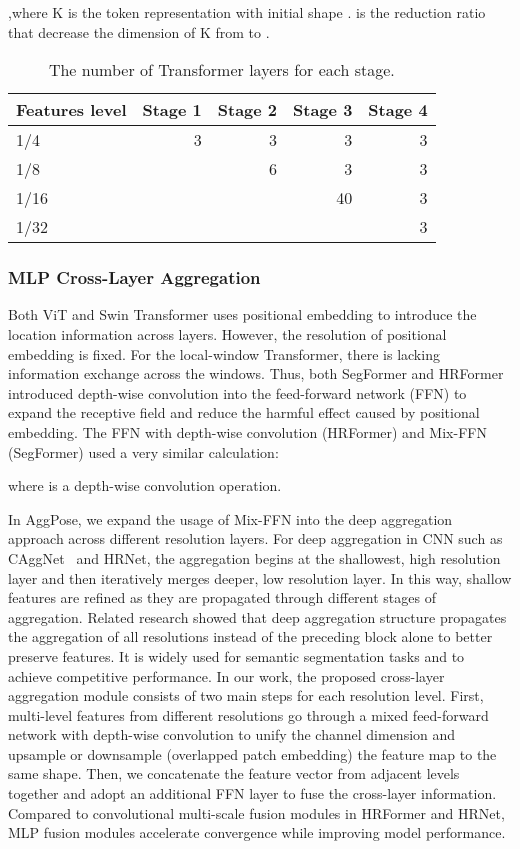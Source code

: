 \documentclass{article}
\begin{document}
,where K is the token representation with initial shape .  is the reduction ratio that decrease the dimension of K from  to .




\begin{table}
\centering
\begin{tabular}{lrrrr}
\toprule
Features level  & Stage 1 & Stage 2 & Stage 3 & Stage 4 \\
\midrule
1/4 & 3  & 3    & 3 & 3      \\
1/8 &   & 6 & 3 & 3       \\
1/16    &   &   & 40    & 3      \\
1/32    &   &   &   & 3      \\
\bottomrule
\end{tabular}
\caption{The number of Transformer layers for each stage.}
\label{tab:transformer_blocks}
\end{table}


\subsubsection{MLP Cross-Layer Aggregation}

Both ViT and Swin Transformer uses positional embedding to introduce the location information across layers. However, the resolution of positional embedding is fixed. For the local-window Transformer, there is lacking information exchange across the windows. Thus, both SegFormer and HRFormer introduced  depth-wise convolution into the feed-forward network (FFN) to expand the receptive field and reduce the harmful effect caused by positional embedding. The FFN with depth-wise convolution (HRFormer) and Mix-FFN (SegFormer) used a very similar calculation:



where  is a  depth-wise convolution operation.

In AggPose, we expand the usage of Mix-FFN into the deep aggregation approach across different resolution layers. For deep aggregation in CNN such as CAggNet~\cite{cao2021caggnet} and HRNet, the aggregation begins at the shallowest, high resolution layer and then iteratively merges deeper, low resolution layer. In this way, shallow features are refined as they are propagated through different stages of aggregation. Related research showed that deep aggregation structure propagates the aggregation of all resolutions instead of the preceding block alone to better preserve features. It is widely used for semantic segmentation tasks and to achieve competitive performance. In our work, the proposed cross-layer aggregation module consists of two main steps for each resolution level. First, multi-level features from different resolutions go through a mixed feed-forward network with  depth-wise convolution to unify the channel dimension and upsample or downsample (overlapped patch embedding) the feature map to the same shape. Then, we concatenate the feature vector from adjacent levels together and adopt an additional FFN layer to fuse the cross-layer information. Compared to convolutional multi-scale fusion modules in HRFormer and HRNet, MLP fusion modules accelerate convergence while improving model performance.
\end{document}
